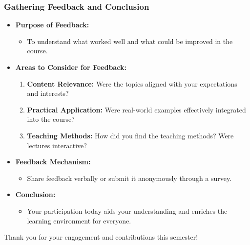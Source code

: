 \documentclass[aspectratio=169]{beamer}
\begin{document}
\begin{frame}[fragile]
  \frametitle{Gathering Feedback and Conclusion}
  \begin{itemize}
    \item \textbf{Purpose of Feedback:}
      \begin{itemize}
        \item To understand what worked well and what could be improved in the course.
      \end{itemize}
      
    \item \textbf{Areas to Consider for Feedback:}
      \begin{enumerate}
        \item \textbf{Content Relevance:} Were the topics aligned with your expectations and interests?
        \item \textbf{Practical Application:} Were real-world examples effectively integrated into the course?
        \item \textbf{Teaching Methods:} How did you find the teaching methods? Were lectures interactive?
      \end{enumerate}
      
    \item \textbf{Feedback Mechanism:}
      \begin{itemize}
        \item Share feedback verbally or submit it anonymously through a survey.
      \end{itemize}
      
    \item \textbf{Conclusion:}
      \begin{itemize}
        \item Your participation today aids your understanding and enriches the learning environment for everyone. 
      \end{itemize}
  \end{itemize}
  
  Thank you for your engagement and contributions this semester!
\end{frame}
\end{document}
